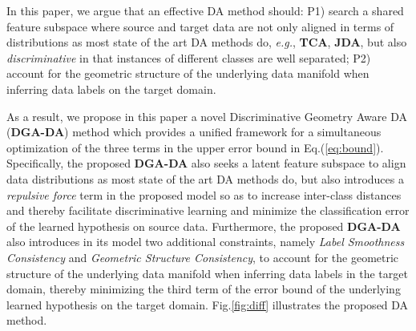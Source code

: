 \documentclass[journal,twocolumn]{IEEEtran}
\begin{document}
\begin{CJK*}{UTF8}{gkai}
    
	In this paper, we argue that an effective DA method should:   P1) search a shared feature subspace where source and target data are not only aligned in terms of distributions as most state of the art DA methods do, \textit{e.g.}, \textbf{TCA}\cite{pan2011domain}, \textbf{JDA}\cite{long2013transfer}, but also \textit{discriminative} in that instances of different classes are well separated; P2) account for the  geometric structure of the underlying data manifold when inferring data labels on the target domain.
    
    As a result, we propose in this paper a novel Discriminative Geometry Aware DA (\textbf{DGA-DA}) method which provides  a unified framework for a simultaneous optimization of the three terms in the  upper error bound  in Eq.(\ref{eq:bound}).  Specifically, the proposed \textbf{DGA-DA} also seeks a latent feature subspace to align data distributions as most state of the art DA methods do, but also introduces a \textit{repulsive force} term in the proposed model so as to increase inter-class distances and thereby facilitate discriminative learning and minimize the classification error of the learned hypothesis on source data. Furthermore, the proposed \textbf{DGA-DA} also introduces in its model two additional constraints, namely \textit{Label Smoothness Consistency} and \textit{Geometric Structure Consistency}, to account for the geometric structure of the underlying data manifold when inferring data labels in the target domain, thereby minimizing the third term of the  error bound of the underlying learned hypothesis on the target domain. Fig.\ref{fig:diff} illustrates the proposed DA method.    
    
	

\end{CJK*}
\end{document}

